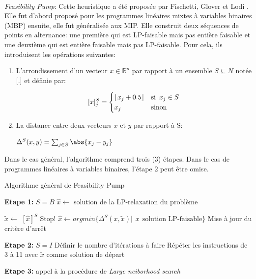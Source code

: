 \documentclass[12pt,a4paper,oneside]{book}
\theoremstyle{definition}
\newcommand{\R}{\mathbb{R}}
\DeclarePairedDelimiter\floor{\lfloor}{\rfloor}
\begin{document}
	\paragraph{}
	\textit{Feasibility Pump}:
	Cette heuristique a été proposée par Fischetti, Glover et Lodi \cite{Fischetti2005}. Elle fut d'abord proposé pour les programmes linéaires mixtes à variables binaires (MBP) ensuite, elle fut généralisée aux MIP. Elle construit deux séquences de points en alternance: une première qui est LP-faisable mais pas entière faisable et une deuxième qui est entière faisable mais pas LP-faisable. Pour cela, ils introduisent les opérations suivantes:
	\begin{enumerate}
		\item L'arrondissement d'un vecteur $x \in \R^n $ par rapport à un ensemble $S \subseteq N$ notée [.] et définie par:
		
		\[
		[x]^S_j = \begin{cases}
		\floor{x_j + 0.5} & \text{si} \hspace{5pt} x_j \in S \\
		x_j & \text{sinon}
		\end{cases}
		\]
		\item La distance entre deux vecteurs $ x$ et $y$ par rapport à S:
		
		$ \Delta^S(x,y) = \sum_{j \in S} \abs{x_j - y_j}$
	\end{enumerate}
	
	Dans le cas général, l'algorithme comprend trois (3) étapes. Dans le cas de programmes linéaires à variables binaires, l'étape 2 peut être omise. \cite{berthold2006}
	
	\begin{algorithm}
		\caption{Algorithme général de Feasibility Pump}
		\SetAlgoLined
		\DontPrintSemicolon
		
		\textbf{Etape 1: } $ S = B $ \;
		$ \hat{x} \gets $ solution de la LP-relaxation du problème \;
		
		{
			$ \tilde{x} \gets  $ $[\hat{x}]^S$ \;
			{ 
				Stop! \;
			}
			{
				$\hat{x} \gets argmin\{\Delta^S(x,\tilde{x}) |\hspace{5pt} x \hspace{5pt} \text{solution LP-faisable}\}$ \;
			}
			Mise à jour du critère d'arrêt \;
		}
		
		\textbf{Etape 2: } $ S = I $ \;
		Définir le nombre d'itérations à faire \;
		Répéter les instructions de 3 à 11 avec $ \tilde{x}$ comme solution de départ \;
		
		\textbf{Etape 3: } appel à la procédure de \textit{Large neiborhood search} \; 
	\end{algorithm}
\end{document}
